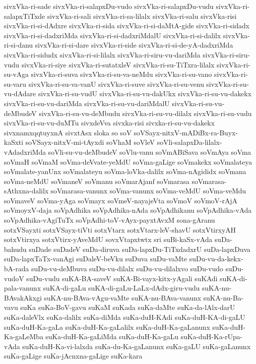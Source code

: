{sivxVka-ri-sade
sivxVka-ri-salapxDu-vudo
sivxVka-ri-salapxDu-vudu
sivxVka-ri-salapxTiTxde
sivxVka-ri-sali
sivxVka-ri-sa-lilalx
sivxVka-ri-salu
sivxVka-risi
sivxVka-ri-si-dAdxre
sivxVka-ri-sida
sivxVka-ri-si-daMtA-gide
sivxVka-ri-sidadx
sivxVka-ri-si-dadxriMda
sivxVka-ri-si-dadxriMdalU
sivxVka-ri-si-dalilx
sivxVka-ri-si-danu
sivxVka-ri-si-dare
sivxVka-ri-side
sivxVka-ri-si-de-yA-dadxriMda
sivxVka-ri-sidudx
sivxVka-ri-si-lilalx
sivxVka-ri-siru-vu-dariMda
sivxVka-ri-siru-vudu
sivxVka-ri-siye
sivxVka-ri-sutatxleV
sivxVka-ri-su-TiTxra-lilalx
sivxVka-ri-su-vAga
sivxVka-ri-suva
sivxVka-ri-su-va-neMdu
sivxVka-ri-su-vano
sivxVka-ri-su-varu
sivxVka-ri-su-va-vanU
sivxVka-ri-suve
sivxVka-ri-su-venu
sivxVka-ri-su-vu-dAdare
sivxVka-ri-su-vudU
sivxVka-ri-su-vu-dakUkx
sivxVka-ri-su-vu-dakekx
sivxVka-ri-su-vu-dariMda
sivxVka-ri-su-vu-dariMdalU
sivxVka-ri-su-vu-deMbudeV
sivxVka-ri-su-vu-deMbudu
sivxVka-ri-su-vu-dilalx
sivxVka-ri-su-vudu
sivxVka-ri-su-vu-duMTu
sivxdeVva
sivxka-risi
sivxka-ri-su-vu-dakekx
sivxnamxqqtuyxnA
sivxtAsx
sloka
so
soV
soVSayx-nitxV-mADiBx-ra-Buyx-kaSxti
soVSayx-nitxV-mi-tAyxdi
soVhaM
soVleV
soVli-salapxDa-lilalx-vAdadxriMda
soVli-su-vu-deMbudeV
soVlu-vanu
soVmABiSava
soVmAya
soVma
soVmaH
soVmaM
soVma-deVvate-yeMdU
soVma-gaLige
soVmakekx
soVmalateya
soVmalate-yanUnx
soVmalateyu
soVma-loVka-dalilx
soVma-nAgididx
soVmana
soVma-neMdU
soVmaneV
soVmanu
soVmarAjanf
soVmarasa
soVmarasa-sAthxna-dalilx
soVmarasa-vanunx
soVma-vanunx
soVma-veMdU
soVma-veMdu
soVmaveV
soVma-yAga
soVmayx
soVmeV-nayajeVta
soVmoV
soVmoV-rAjA
soVmoyxV-daja
soVpAdhika
soVpAdhika-nAda
soVpAdhikanu
soVpAdhika-vAda
soVpAdhika-vAgiTuTx
soVpAdhi-toV-vAyx-payxtAvxM
sona-gAranu
sotxVSayxti
sotxVSayx-tiVti
sotxVtarx
sotxVtarx-leV-shavU
sotxVtirxyAH
sotxVtirxya
sotxVtirx-yAveMdU
sovxVtapxtwtx
sri
suBi-kaSx-vAda
suDa-bahudu
suDade
suDadeV
suDa-diruva
suDa-lapxDu-TiTxdadxrU
suDa-lapxDuva
suDa-lapxTaTx-vanAgi
suDaleV-beVku
suDuva
suDu-vaMte
suDu-vu-da-kekx-bA-rada
suDu-vu-deMbuva
suDu-vu-dilalx
suDu-vu-dilalxvo
suDu-vudo
suDu-vudoV
suDu-vudu
suKA-BA-saveV
suKA-Bi-vayx-kitx-yAgali
suKAdi
suKA-di-pala-vanunx
suKA-di-gaLu
suKA-di-gaLu-LaLx-dAdx-giru-vudu
suKA-nu-BAvakAkxgi
suKA-nu-BAva-vAgu-vaMte
suKA-nu-BAva-vanunx
suKA-nu-Ba-vavu
suKa
suKa-BoV-gavu
suKaM
suKada
suKa-daMte
suKa-da-lAlx-darU
suKa-daleVlx
suKa-dalilx
suKa-diMda
suKa-duH-KAdi
suKa-duH-KA-di-gaLU
suKa-duH-Ka-gaLa
suKa-duH-Ka-gaLalilx
suKa-duH-Ka-gaLanunx
suKa-duH-Ka-gaLeMba
suKa-duH-Ka-gaLiMda
suKa-duH-Ka-gaLu
suKa-duH-Ka-rUpa-vAda
suKa-duH-Ka-vi-lalxda
suKa-du-Ka-gaLanunx
suKa-gaLU
suKa-gaLanunx
suKa-gaLige
suKa-jAcnxna-gaLige
suKa-kara
}
